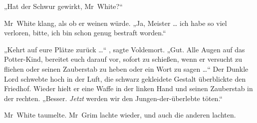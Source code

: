 „Hat der Schwur gewirkt, Mr~White?“

Mr~White klang, als ob er weinen würde.
„Ja, Meister … ich habe so viel verloren, bitte, ich bin schon genug bestraft worden.“

„Kehrt auf eure Plätze zurück …“ , sagte Voldemort.
„Gut. Alle Augen auf das Potter-Kind, bereitet euch darauf vor, sofort zu schießen, wenn er versucht zu fliehen oder seinen Zauberstab zu heben oder ein Wort zu sagen …“
Der Dunkle Lord schwebte hoch in der Luft, die schwarz gekleidete Gestalt überblickte den Friedhof. Wieder hielt er eine Waffe in der linken Hand und seinen Zauberstab in der rechten.
„Besser. \emph{Jetzt} werden wir den Jungen-der-überlebte töten.“

Mr~White taumelte. Mr~Grim lachte wieder, und auch die anderen lachten.

